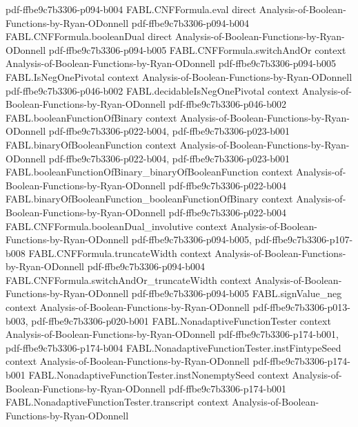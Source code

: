 \begin{theorem}
  {pdf-ffbe9c7b3306-p094-b004}
\proofstep
  {FABL.CNFFormula.eval}
  {direct}
  {Analysis-of-Boolean-Functions-by-Ryan-ODonnell}
  {pdf-ffbe9c7b3306-p094-b004}
\proofstep
  {FABL.CNFFormula.booleanDual}
  {direct}
  {Analysis-of-Boolean-Functions-by-Ryan-ODonnell}
  {pdf-ffbe9c7b3306-p094-b005}
\proofstep
  {FABL.CNFFormula.switchAndOr}
  {context}
  {Analysis-of-Boolean-Functions-by-Ryan-ODonnell}
  {pdf-ffbe9c7b3306-p094-b005}
\proofstep
  {FABL.IsNegOnePivotal}
  {context}
  {Analysis-of-Boolean-Functions-by-Ryan-ODonnell}
  {pdf-ffbe9c7b3306-p046-b002}
\proofstep
  {FABL.decidableIsNegOnePivotal}
  {context}
  {Analysis-of-Boolean-Functions-by-Ryan-ODonnell}
  {pdf-ffbe9c7b3306-p046-b002}
\proofstep
  {FABL.booleanFunctionOfBinary}
  {context}
  {Analysis-of-Boolean-Functions-by-Ryan-ODonnell}
  {pdf-ffbe9c7b3306-p022-b004,
    pdf-ffbe9c7b3306-p023-b001}
\proofstep
  {FABL.binaryOfBooleanFunction}
  {context}
  {Analysis-of-Boolean-Functions-by-Ryan-ODonnell}
  {pdf-ffbe9c7b3306-p022-b004,
    pdf-ffbe9c7b3306-p023-b001}
\proofstep
  {FABL.booleanFunctionOfBinary_binaryOfBooleanFunction}
  {context}
  {Analysis-of-Boolean-Functions-by-Ryan-ODonnell}
  {pdf-ffbe9c7b3306-p022-b004}
\proofstep
  {FABL.binaryOfBooleanFunction_booleanFunctionOfBinary}
  {context}
  {Analysis-of-Boolean-Functions-by-Ryan-ODonnell}
  {pdf-ffbe9c7b3306-p022-b004}
\proofstep
  {FABL.CNFFormula.booleanDual_involutive}
  {context}
  {Analysis-of-Boolean-Functions-by-Ryan-ODonnell}
  {pdf-ffbe9c7b3306-p094-b005,
    pdf-ffbe9c7b3306-p107-b008}
\proofstep
  {FABL.CNFFormula.truncateWidth}
  {context}
  {Analysis-of-Boolean-Functions-by-Ryan-ODonnell}
  {pdf-ffbe9c7b3306-p094-b004}
\proofstep
  {FABL.CNFFormula.switchAndOr_truncateWidth}
  {context}
  {Analysis-of-Boolean-Functions-by-Ryan-ODonnell}
  {pdf-ffbe9c7b3306-p094-b005}
\proofstep
  {FABL.signValue_neg}
  {context}
  {Analysis-of-Boolean-Functions-by-Ryan-ODonnell}
  {pdf-ffbe9c7b3306-p013-b003,
    pdf-ffbe9c7b3306-p020-b001}
\proofstep
  {FABL.NonadaptiveFunctionTester}
  {context}
  {Analysis-of-Boolean-Functions-by-Ryan-ODonnell}
  {pdf-ffbe9c7b3306-p174-b001,
    pdf-ffbe9c7b3306-p174-b004}
\proofstep
  {FABL.NonadaptiveFunctionTester.instFintypeSeed}
  {context}
  {Analysis-of-Boolean-Functions-by-Ryan-ODonnell}
  {pdf-ffbe9c7b3306-p174-b001}
\proofstep
  {FABL.NonadaptiveFunctionTester.instNonemptySeed}
  {context}
  {Analysis-of-Boolean-Functions-by-Ryan-ODonnell}
  {pdf-ffbe9c7b3306-p174-b001}
\proofstep
  {FABL.NonadaptiveFunctionTester.transcript}
  {context}
  {Analysis-of-Boolean-Functions-by-Ryan-ODonnell}

\end{theorem}

